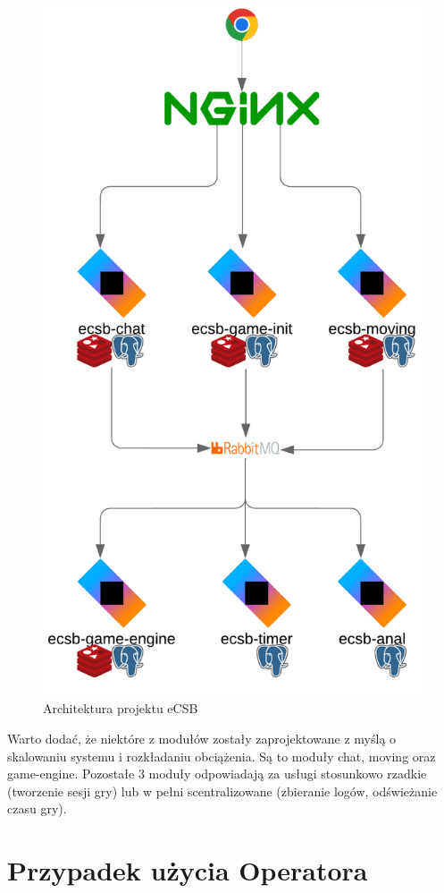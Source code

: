 \documentclass[polish]{aghengthesis}
\begin{document}
\begin{figure}[h!]
    \centering
    \includegraphics[width=0.8\linewidth]{documentation/resources/ecsb-schema.png}
    \caption{Architektura projektu eCSB}
    \label{fig:schema}
\end{figure}

\newpage
Warto dodać, że niektóre z modułów zostały zaprojektowane z myślą o skalowaniu systemu i rozkładaniu obciążenia. Są to moduły chat, moving oraz game-engine. Pozostałe 3 moduły odpowiadają za usługi stosunkowo rzadkie (tworzenie sesji gry) lub w pełni scentralizowane (zbieranie logów, odświeżanie czasu gry). 

\section{Przypadek użycia Operatora}
\end{document}
